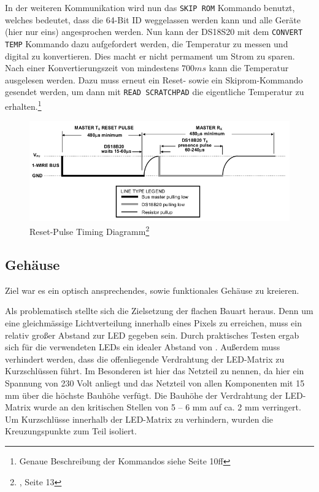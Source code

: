 In der weiteren Kommunikation wird nun das \texttt{SKIP ROM} Kommando benutzt, welches bedeutet, dass die 64-Bit ID weggelassen werden kann und alle Geräte (hier nur eins) angesprochen werden. Nun kann der DS18S20 mit dem \texttt{CONVERT TEMP} Kommando dazu aufgefordert werden, die Temperatur zu messen und digital zu konvertieren. Dies macht er nicht permament um Strom zu sparen. Nach einer Konvertierungszeit von mindestens $700 ms$ kann die Temperatur ausgelesen werden. Dazu muss erneut ein Reset- sowie ein Skiprom-Kommando gesendet werden, um dann mit \texttt{READ SCRATCHPAD} die eigentliche Temperatur zu erhalten.\footnote{Genaue Beschreibung der Kommandos siehe \cite{ds18s20} Seite 10ff}
%
\begin{figure}[htp]
\centering
\centerline{\includegraphics[width=\linewidth]{skizzen/temperatur_reset.png}}
\caption{Reset-Pulse Timing Diagramm\footnote{\cite{ds18s20}, Seite 13}}\label{fig_resettiming}
\end{figure}
%
\subsection{Gehäuse}
%
Ziel war es ein optisch ansprechendes, sowie funktionales Gehäuse zu kreieren. 

Als problematisch stellte sich die Zielsetzung der flachen Bauart heraus. Denn um eine gleichmässige Lichtverteilung innerhalb eines Pixels zu erreichen, muss ein relativ großer Abstand zur LED gegeben sein. Durch praktisches Testen ergab sich für die verwendeten LEDs ein idealer Abstand von .%
Außerdem muss verhindert werden, dass die offenliegende Verdrahtung der LED-Matrix zu Kurzschlüssen führt. Im Besonderen ist hier das Netzteil zu nennen, da hier ein Spannung von 230 Volt anliegt und das Netzteil von allen Komponenten mit 15 mm %
über die höchste Bauhöhe verfügt. 
Die Bauhöhe der Verdrahtung der LED-Matrix wurde an den kritischen Stellen von 5 -- 6 mm auf ca. 2 mm verringert. Um Kurzschlüsse innerhalb der LED-Matrix zu verhindern, wurden die Kreuzungspunkte zum Teil isoliert.

